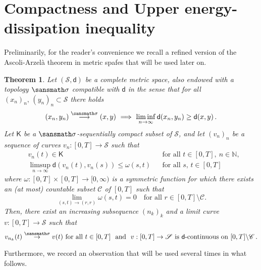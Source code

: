 \documentclass[11pt,reqno]{amsart}
\numberwithin{equation}{section}
\newcommand{\N}{\mathbb{N}}
\newtheorem{theorem}{Theorem}[section]
\theoremstyle{definition}
\newcommand{\serifsigma}{{\sansmath \sigma}}
\newcommand{\RNEW}{\color{black}} %
\numberwithin{equation}{section}
\begin{document}
\section{Compactness and Upper energy-dissipation inequality}
\label{s:5}
\RNEW Preliminarily,  for the reader's convenience  we recall a refined version of the Ascoli-Arzel\`a theorem in metric spafes that will be used later on.
\begin{theorem}{\cite[Prop.\ 3.3.1]{AGS08}}
\label{thm:Ascoli}
Let $(\mathscr{S}, \mathsf{d})$ be a complete  metric space, also endowed with a topology $\serifsigma$ compatible with $\mathsf{d}$ in the sense that
for all $(x_n)_n,\, (y_n)_n \subset \mathscr{S}$ there holds
\begin{equation}
\label{compatibility-top-metr}
(x_n,y_n) \stackrel{\serifsigma}{\longrightarrow} (x,y) \ \Longrightarrow  \ \liminf_{n\to\infty} \mathsf{d}(x_n,y_n) \geq \mathsf{d}(x,y)\,. 
\end{equation}
Let $\mathsf{K}$ be a $\serifsigma$-sequentially compact subset of  $\mathscr{S}$, and let
$(v_n)_n$
be a sequence of curves  $v_n : [0,T]\to \mathscr{S}  $ such that 
\begin{subequations}
\label{conditions-for-Ascoli}
\begin{align}
\label{compactness}
& v_n(t) \in \mathsf{K} && \text{for all } t \in [0,T], \ n \in \N,
\\
& 
\label{equicontinuity}
\limsup_{n\to\infty} \mathsf{d}(v_n(t),v_n(s)) \leq \omega(s,t) && \text{for all } s,\, t \in [0,T]
\end{align}
\end{subequations}
where  $\omega : [0,T]{\times}[0,T]\to [0,\infty)$ is a   symmetric function for which there exists an (at most) countable subset $\mathscr{C}$ of $[0,T]$ such that
\[
\lim_{(s,t) \to (r,r)}\omega(s,t) = 0 \quad \text{for all } r\in [0,T]{\setminus}\mathscr{C}.
\]
Then, there exist an increasing subsequence $(n_k)_k$ and a limit curve $v: [0,T]\to \mathscr{S}$ such that 
\[
v_{n_k}(t) \stackrel{\serifsigma}{\to} v(t) \text{ for all } t \in [0,T] \ \text{ and } \ v: [0,T]\to \mathscr{S} \text{ is } \mathsf{d}\text{-continuous on } [0,T]{\setminus}\mathscr{C}\,. 
\]
\end{theorem}








\par
Furthermore, 
we record an observation that will be used several times in what follows.
\end{document}
